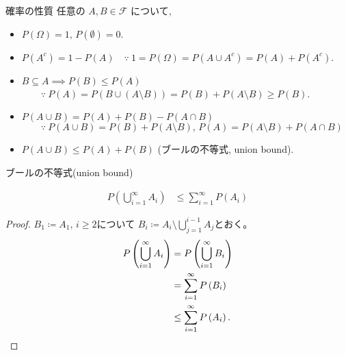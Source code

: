 \documentclass[lualatex,handout]{beamer}
\theoremstyle{definition}
\begin{document}
\begin{frame}{確率の性質}
任意の $A,B\in\mathcal{F}$ について,
\begin{itemize}
\setlength{\itemsep}{1em}
\item $P(\Omega)=1,\,P(\emptyset)=0$.
\item $P(A^c) = 1 - P(A) \quad\because\ 1 = P(\Omega) = P(A\cup A^c) = P(A) + P(A^c)$.
\item $B\subseteq A\implies P(B) \le P(A)$\\
$\qquad \because\ P(A) = P(B\cup (A\setminus B)) = P(B) + P(A\setminus B)\ge P(B)$.
\item $P(A\cup B) = P(A) + P(B) - P(A\cap B)$\\
$\qquad \because\ P(A\cup B) = P(B) + P(A\setminus B),\, P(A) = P(A\setminus B) + P(A\cap B)$
\item $P(A\cup B) \le P(A) + P(B)$ (ブールの不等式, union bound).
\end{itemize}
\end{frame}

\begin{frame}{ブールの不等式(union bound)}
\begin{theorem}
\begin{align*}
P\left(\bigcup_{i=1}^\infty A_i\right) &\le \sum_{i=1}^\infty P(A_i)
\end{align*}
\end{theorem}
\begin{proof}
$B_1\coloneq A_1$, $i\ge 2$について $B_i\coloneq A_i\setminus \bigcup_{j=1}^{i-1} A_j$とおく。
\begin{align*}
P\left(\bigcup_{i=1}^\infty A_i\right) &= P\left(\bigcup_{i=1}^\infty B_i\right)\\
&= \sum_{i=1}^\infty P\left(B_i\right)\\
&\le \sum_{i=1}^\infty P\left(A_i\right).\qedhere
\end{align*}
\end{proof}
\end{frame}
\end{document}
